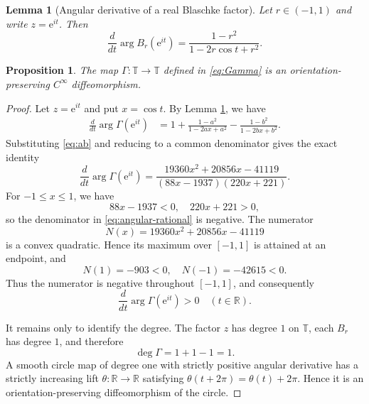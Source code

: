 \documentclass[10pt,a4paper]{amsart}
\newtheorem{lemma}{Lemma}
\newtheorem{proposition}{Proposition}
\newcommand{\R}{\mathbb R}
\newcommand{\T}{\mathbb T}
\newcommand{\e}{\mathrm e}
\begin{document}
\begin{lemma}[Angular derivative of a real Blaschke factor]\label{lem:angular-Blaschke}
Let $r\in(-1,1)$ and write $z=\e^{it}$.  Then
\[
 \frac{d}{dt}\arg B_r(\e^{it})
 =\frac{1-r^2}{1-2r\cos t+r^2}.
\]
\end{lemma}

\begin{proposition}\label{prop:Gamma-homeo}
The map $\Gamma:\T\to\T$ defined in \eqref{eq:Gamma} is an orientation-preserving $C^\infty$ diffeomorphism.
\end{proposition}

\begin{proof}
Let $z=\e^{it}$ and put $x=\cos t$.  By Lemma \ref{lem:angular-Blaschke}, we have
\begin{align}
 \frac{d}{dt}\arg\Gamma(\e^{it})
 &=1+\frac{1-a^2}{1-2ax+a^2}
   -\frac{1-b^2}{1-2bx+b^2}.
\end{align}
Substituting \eqref{eq:ab} and reducing to a common denominator gives the exact identity
\begin{equation}\label{eq:angular-rational}
 \frac{d}{dt}\arg\Gamma(\e^{it})
 =\frac{19360x^2+20856x-41119}
 {(88x-1937)(220x+221)}.
\end{equation}
For $-1\le x\le1$, we have
\[
 88x-1937<0,
 \quad
 220x+221>0,
\]
so the denominator in \eqref{eq:angular-rational} is negative.  The numerator
\[
 N(x)=19360x^2+20856x-41119
\]
is a convex quadratic.  Hence its maximum over $[-1,1]$ is attained at an endpoint, and
\[
 N(1)=-903<0,
 \quad
 N(-1)=-42615<0.
\]
Thus the numerator is negative throughout $[-1,1]$, and consequently
\begin{equation}\label{eq:angular-positive}
 \frac{d}{dt}\arg\Gamma(\e^{it})>0
 \quad(t\in\R).
\end{equation}

It remains only to identify the degree.  The factor $z$ has degree $1$ on $\T$, each $B_r$ has degree $1$, and therefore
\[
 \deg\Gamma=1+1-1=1.
\]
A smooth circle map of degree one with strictly positive angular derivative has a strictly increasing lift $\theta:\R\to\R$ satisfying $\theta(t+2\pi)=\theta(t)+2\pi$.  Hence it is an orientation-preserving diffeomorphism of the circle.
\end{proof}
\end{document}
